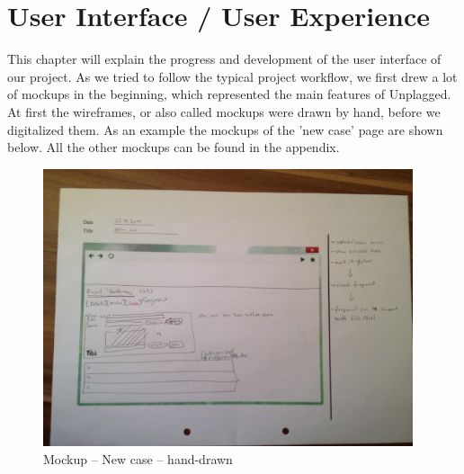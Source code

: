 \section{User Interface / User Experience}

This chapter will explain the progress and development of the user interface of our project. As we tried to follow the typical project workflow, we first drew a lot of mockups in the beginning, which represented the main features of Unplagged. At first the wireframes, or also called mockups were drawn by hand, before we digitalized them. As an example the mockups of the 'new case' page are shown below. All the other mockups can be found in the appendix.

\begin{figure}[htbp]
  \centering
    \includegraphics[width=0.97\textwidth]{mockups/m_new_case.jpg}
  \caption{Mockup – New case – hand-drawn}
  \label{fig:mNewCaseMockup}
\end{figure}

